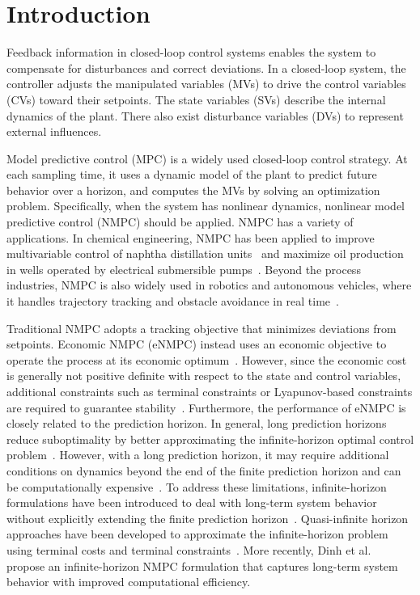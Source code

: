 \documentclass[11pt]{article}
\begin{document}
\section{Introduction}

Feedback information in closed-loop control systems enables the system to compensate for disturbances and correct deviations. In a closed-loop system, the controller adjusts the manipulated variables (MVs) to drive the control variables (CVs) toward their setpoints. The state variables (SVs) describe the internal dynamics of the plant. There also exist disturbance variables (DVs) to represent external influences.

Model predictive control (MPC) is a widely used closed-loop control strategy. At each sampling time, it uses a dynamic model of the plant to predict future behavior over a horizon, and computes the MVs by solving an optimization problem. Specifically, when the system has nonlinear dynamics, nonlinear model predictive control (NMPC) should be applied. NMPC has a variety of applications. In chemical engineering, NMPC has been applied to improve multivariable control of naphtha distillation units~\cite{STABROV202553} and maximize oil production in wells operated by electrical submersible pumps~\cite{DEABREU2025109304}. Beyond the process industries, NMPC is also widely used in robotics and autonomous vehicles, where it handles trajectory tracking and obstacle avoidance in real time~\cite{11393908,qi2025nmpc}.

Traditional NMPC adopts a tracking objective that minimizes deviations from setpoints. Economic NMPC (eNMPC) instead uses an economic objective to operate the process at its economic optimum~\cite{ELLIS20141156}. However, since the economic cost is generally not positive definite with respect to the state and control variables, additional constraints such as terminal constraints or Lyapunov-based constraints are required to guarantee stability~\cite{5672577,GRIFFITH2018109}. Furthermore, the performance of eNMPC is closely related to the prediction horizon. In general, long prediction horizons reduce suboptimality by better approximating the infinite-horizon optimal control problem~\cite{4639448}. However, with a long prediction horizon, it may require additional conditions on dynamics beyond the end of the finite prediction horizon and can be computationally expensive~\cite{CHEN19981205,DINH2025103565}. To address these limitations, infinite-horizon formulations have been introduced to deal with long-term system behavior without explicitly extending the finite prediction horizon~\cite{keerthi1988}. Quasi-infinite horizon approaches have been developed to approximate the infinite-horizon problem using terminal costs and terminal constraints~\cite{CHEN19981205}. More recently, Dinh et al.~\cite{DINH2025103565} propose an infinite-horizon NMPC formulation that captures long-term system behavior with improved computational efficiency.
\end{document}
